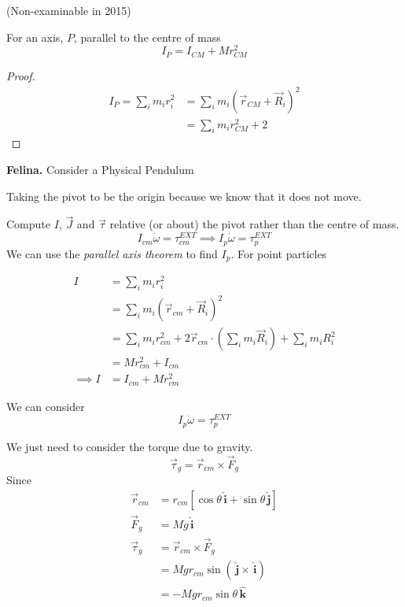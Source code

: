 \documentclass[twoside]{scrartcl}
\let\oldhat\hat
\renewcommand{\hat}[1]{\,\oldhat{\boldsymbol{\mathbf{#1}}}}
\begin{document}
(Non-examinable in 2015)
\begin{theorem}
For an axis, $P$, parallel to the centre of mass	\[I_P = I_{CM} + Mr^2_{CM}\]
\end{theorem}
\begin{proof}
\[\begin{aligned}I_P = \sum_{i} m_ir_i^2 &= \sum_i m_i(\vec{r}_{CM} + \vec{R}_i)^2\\
&= \sum_i m_i r_{CM}^2 + 2	
\end{aligned}
\]
\end{proof}

\textbf{Felina.} Consider a Physical Pendulum
  \begin{center}
  \end{center}
  
 Taking the pivot to be the origin because we know that it does not move. 
 
 Compute $I$, $\vec{J}$ and $\vec{\tau}$ relative (or about) the pivot rather than the centre of mass. 
 \[I_{cm}\dot{\omega} = \tau_{cm}^{EXT} \implies I_p\dot{\omega} = \tau_p^{EXT}\]
 We can use the \emph{parallel axis theorem} to find $I_p$. For point particles
 
\[\begin{aligned}
I &= \sum_i m_ir_i^2\\
&= \sum_i m_i(\vec{r}_{cm} + \vec{R}_i)^2\\
&= \sum_i m_ir_{cm}^2 + 2\vec{r}_{cm}\cdot(\sum_im_i\vec{R}_i) + \sum_im_iR_i^2\\
&= Mr_{cm}^2 + I_{cm}\\
\implies I &= I_{cm} + Mr_{cm}^2
\end{aligned}
\]


We can consider 
\[I_p\dot{\omega} = \tau_p^{EXT}\]

We just need to consider the torque due to gravity. 
\[\vec{\tau}_g = \vec{r}_{cm} \times \vec{F}_g\]
Since 
\[
\begin{aligned}
\vec{r}_{cm} &= r_{cm}[\cos\theta\hat{i} + \sin\theta\hat{j}]\\
\vec{F}_g &= Mg\hat{i}\\
\vec{\tau}_g &= \vec{r}_{cm} \times \vec{F}_g\\
&= Mgr_{cm}\sin(\hat{j} \times \hat{i})\\
&= -Mgr_{cm}\sin\theta\hat{k}
\end{aligned}
\]
\end{document}
